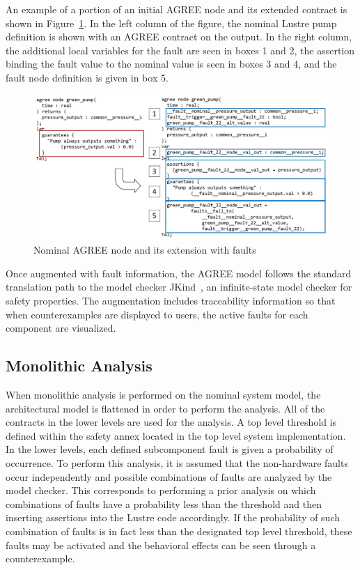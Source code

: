 An example of a portion of an initial AGREE node and its extended contract is shown in Figure~\ref{fig:lustre}. 
In the left column of the figure, the nominal Lustre pump definition is shown with an AGREE contract on the output. In the right column, the additional local variables for the fault are seen in boxes 1 and 2, the assertion binding the fault value to the nominal value is seen in boxes 3 and 4, and the fault node definition is given in box 5. 

\begin{figure}[h!]
	\hspace*{-2cm}
	\vspace{-0.3in} 
	\begin{center}
		\includegraphics[scale=0.3]{images/lustre.jpg}
		\caption{Nominal AGREE node and its extension with faults}
		\label{fig:lustre}
	\end{center}
	\vspace{-0.3in}
\end{figure}


Once augmented with fault information, the AGREE model follows the standard translation path to the model checker JKind~\cite{2017arXiv171201222G}, an infinite-state model checker for safety properties.  The augmentation includes traceability information so that when counterexamples are displayed to users, the active faults for each component are visualized.

\subsection{Monolithic Analysis}


When monolithic analysis is performed on the nominal system model, the architectural model is flattened in order to perform the analysis. All of the contracts in the lower levels are used for the analysis.
A top level threshold is defined within the safety annex located in the top level system implementation. In the lower levels, each defined subcomponent fault is given a probability of occurrence. To perform this analysis, it is assumed that the non-hardware faults occur independently and possible combinations of faults are analyzed by the model checker. This corresponds to performing a prior analysis on which combinations of faults have a probability less than the threshold and then inserting assertions into the Lustre code accordingly. If the probability of such combination of faults is in fact less than the designated top level threshold, these faults may be activated and the behavioral effects can be seen through a counterexample.  

